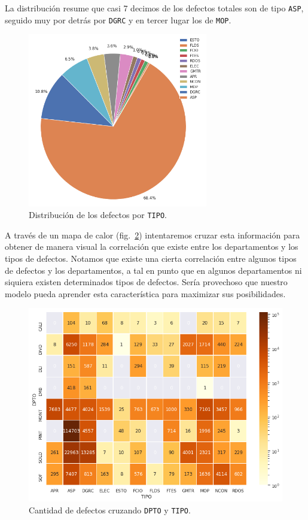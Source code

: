 \documentclass[a4paper,12pt]{article}
\begin{document}
La distribución resume que casi 7 decimos de los defectos totales son de tipo \texttt{ASP}, seguido muy por detrás por \texttt{DGRC} y en tercer lugar los de \texttt{MOP}.

\begin{figure}[H]
	\begin{center}				
	\includegraphics[width=0.7\textwidth]{tesis_55.png}
  	\caption{Distribución de los defectos por \texttt{TIPO}.}
  	\label{fig:distgvdtype}
  	\end{center}
\end{figure}

A través de un mapa de calor (fig.~\ref{fig:heatmapdptotype}) intentaremos cruzar esta información para obtener de manera visual la correlación que existe entre los departamentos y los tipos de defectos.
Notamos que existe una cierta correlación entre algunos tipos de defectos y los departamentos, a tal en punto que en algunos departamentos ni siquiera existen determinados tipos de defectos. Sería provechoso que nuestro modelo pueda aprender esta característica para maximizar sus posibilidades.

\begin{figure}[H]
	\begin{center}
	\includegraphics[width=1\textwidth]{tesis_56.png}
  	\caption{Cantidad de defectos cruzando \texttt{DPTO} y \texttt{TIPO}.}
  	\label{fig:heatmapdptotype}
  	\end{center}
\end{figure}
\end{document}
